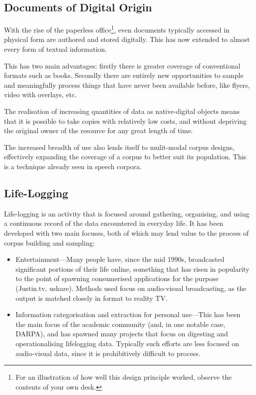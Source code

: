 





\subsection{Documents of Digital Origin}
With the rise of the paperless office\footnote{For an illustration of how well this design principle worked, observe the contents of your own desk.}, even documents typically accessed in physical form are authored and stored digitally.  This has now extended to almost every form of textual information.

This has two main advantages: firstly there is greater coverage of conventional formats such as books.  Secondly there are entirely new opportunities to sample and meaningfully process things that have never been available before, like flyers, video with overlays, etc.

The realisation of increasing quantities of data as native-digital objects means that it is possible to take copies with relatively low costs, and without depriving the original owner of the resource for any great length of time.

The increased breadth of use also lends itself to mulit-modal corpus designs, effectively expanding the coverage of a corpus to better suit its population.  This is a technique already seen in speech corpora.



\subsection{Life-Logging}
Life-logging is an activity that is focused around gathering, organising, and using a continuous record of the data encountered in everyday life.  It has been developed with two main focuses, both of which may lend value to the process of corpus building and sampling:

\begin{itemize}
    \item Entertainment---Many people have, since the mid 1990s, broadcasted significant portions of their life online, something that has risen in popularity to the point of spawning consumerised applications for the purpose (Justin.tv, ushare).  Methods used focus on audio-visual broadcasting, as the output is matched closely in format to reality TV.
    \item Information categorisation and extraction for personal use---This has been the main focus of the academic community (and, in one notable case, DARPA), and has spawned many projects that focus on digesting and operationalising lifelogging data.  Typically such efforts are less focused on audio-visual data, since it is prohibitively difficult to process.
\end{itemize}


